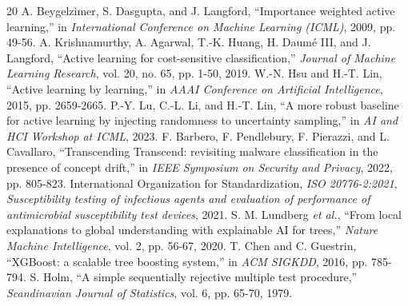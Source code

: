 \documentclass[conference,a4paper]{IEEEtran}
\begin{document}
\begin{thebibliography}{20}
 A. Beygelzimer, S. Dasgupta, and J. Langford, ``Importance weighted active learning,'' in \textit{International Conference on Machine Learning (ICML)}, 2009, pp. 49-56.
 A. Krishnamurthy, A. Agarwal, T.-K. Huang, H. Daum\'e III, and J. Langford, ``Active learning for cost-sensitive classification,'' \textit{Journal of Machine Learning Research}, vol. 20, no. 65, pp. 1-50, 2019.
 W.-N. Hsu and H.-T. Lin, ``Active learning by learning,'' in \textit{AAAI Conference on Artificial Intelligence}, 2015, pp. 2659-2665.
 P.-Y. Lu, C.-L. Li, and H.-T. Lin, ``A more robust baseline for active learning by injecting randomness to uncertainty sampling,'' in \textit{AI and HCI Workshop at ICML}, 2023.
 F. Barbero, F. Pendlebury, F. Pierazzi, and L. Cavallaro, ``Transcending Transcend: revisiting malware classification in the presence of concept drift,'' in \textit{IEEE Symposium on Security and Privacy}, 2022, pp. 805-823.
 International Organization for Standardization, \textit{ISO 20776-2:2021, Susceptibility testing of infectious agents and evaluation of performance of antimicrobial susceptibility test devices}, 2021.
 S. M. Lundberg \textit{et al.}, ``From local explanations to global understanding with explainable AI for trees,'' \textit{Nature Machine Intelligence}, vol. 2, pp. 56-67, 2020.
 T. Chen and C. Guestrin, ``XGBoost: a scalable tree boosting system,'' in \textit{ACM SIGKDD}, 2016, pp. 785-794.
 S. Holm, ``A simple sequentially rejective multiple test procedure,'' \textit{Scandinavian Journal of Statistics}, vol. 6, pp. 65-70, 1979.
\end{thebibliography}
\end{document}
